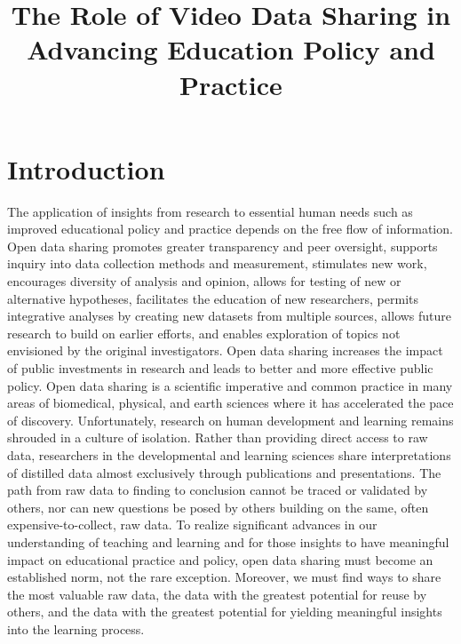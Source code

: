\documentclass[letterpaper,man,apacite]{apa6}
\title{The Role of Video Data Sharing in Advancing Education Policy and Practice}
\begin{document}
\maketitle

\section{Introduction}

The application of insights from research to essential human needs such as improved educational policy and practice depends on the free flow of information. 
Open data sharing promotes greater transparency and peer oversight, supports inquiry into data collection methods and measurement, stimulates new work, encourages diversity of analysis and opinion, allows for testing of new or alternative hypotheses, facilitates the education of new researchers, permits integrative analyses by creating new datasets from multiple sources, allows future research to build on earlier efforts, and enables exploration of topics not envisioned by the original investigators. 
Open data sharing increases the impact of public investments in research and leads to better and more effective public policy.
Open data sharing is a scientific imperative and common practice in many areas of biomedical, physical, and earth sciences where it has accelerated the pace of discovery. 
Unfortunately, research on human development and learning remains shrouded in a culture of isolation. 
Rather than providing direct access to raw data, researchers in the developmental and learning sciences share interpretations of distilled data almost exclusively through publications and presentations.
The path from raw data to finding to conclusion cannot be traced or validated by others, nor can new questions be posed by others building on the same, often expensive-to-collect, raw data.
To realize significant advances in our understanding of teaching and learning and for those insights to have meaningful impact on educational practice and policy, open data sharing must become an established norm, not the rare exception.
Moreover, we must find ways to share the most valuable raw data, the data with the greatest potential for reuse by others, and the data with the greatest potential for yielding meaningful insights into the learning process.
\end{document}
